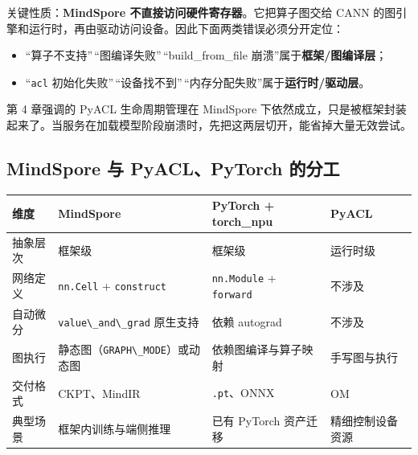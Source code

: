 关键性质：\textbf{MindSpore 不直接访问硬件寄存器}。它把算子图交给 CANN
的图引擎和运行时，再由驱动访问设备。因此下面两类错误必须分开定位：

\begin{itemize}
\tightlist
\item
  ``算子不支持''\,``图编译失败''\,``build\_from\_file
  崩溃''属于\textbf{框架/图编译层}；
\item
  ``\passthrough{\lstinline!acl!}
  初始化失败''\,``设备找不到''\,``内存分配失败''属于\textbf{运行时/驱动层}。
\end{itemize}

第 4 章强调的 PyACL 生命周期管理在 MindSpore
下依然成立，只是被框架封装起来了。当服务在加载模型阶段崩溃时，先把这两层切开，能省掉大量无效尝试。

\subsection{MindSpore 与 PyACL、PyTorch
的分工}\label{src-book-chapter5-h4}

\begin{longtable}[]{@{}
  >{\raggedright\arraybackslash}p{}
  >{\raggedright\arraybackslash}p{}
  >{\raggedright\arraybackslash}p{}
  >{\raggedright\arraybackslash}p{}@{}}
\toprule\noalign{}
\begin{minipage}[b]{\linewidth}\raggedright
维度
\end{minipage} & \begin{minipage}[b]{\linewidth}\raggedright
MindSpore
\end{minipage} & \begin{minipage}[b]{\linewidth}\raggedright
PyTorch + torch\_npu
\end{minipage} & \begin{minipage}[b]{\linewidth}\raggedright
PyACL
\end{minipage} \\
\midrule\noalign{}
\endhead
\bottomrule\noalign{}
\endlastfoot
抽象层次 & 框架级 & 框架级 & 运行时级 \\
网络定义 & \passthrough{\lstinline!nn.Cell!} +
\passthrough{\lstinline!construct!} &
\passthrough{\lstinline!nn.Module!} + \passthrough{\lstinline!forward!}
& 不涉及 \\
自动微分 & \passthrough{\lstinline!value\_and\_grad!} 原生支持 & 依赖
autograd & 不涉及 \\
图执行 & 静态图（\passthrough{\lstinline!GRAPH\_MODE!}）或动态图 &
依赖图编译与算子映射 & 手写图与执行 \\
交付格式 & CKPT、MindIR & \passthrough{\lstinline!.pt!}、ONNX & OM \\
典型场景 & 框架内训练与端侧推理 & 已有 PyTorch 资产迁移 &
精细控制设备资源 \\
\end{longtable}

